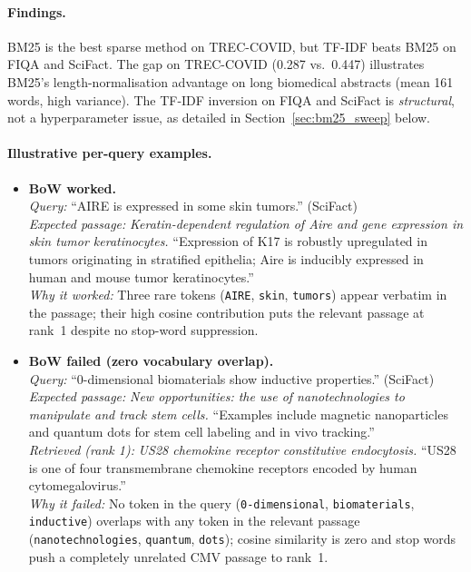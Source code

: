 \documentclass[12pt, a4paper]{article}
\newcommand{\tc}{TREC-COVID}
\newcommand{\fiqa}{FIQA}
\newcommand{\scifact}{SciFact}
\begin{document}
\paragraph{Findings.}
BM25 is the best sparse method on \tc{}, but TF-IDF beats BM25 on \fiqa{}
and \scifact{}.  The gap on \tc{} (0.287 vs.\ 0.447) illustrates BM25's
length-normalisation advantage on long biomedical abstracts (mean 161 words,
high variance).  The TF-IDF inversion on \fiqa{} and \scifact{} is
\emph{structural}, not a hyperparameter issue, as detailed in
Section~\ref{sec:bm25_sweep} below.

\paragraph{Illustrative per-query examples.}
\begin{itemize}

\item \textbf{BoW worked.}\\
  \textit{Query:} ``AIRE is expressed in some skin tumors.'' (\scifact{})\\
  \textit{Expected passage:} \textit{Keratin-dependent regulation of Aire and gene expression
    in skin tumor keratinocytes.} ``Expression of K17 is robustly upregulated in tumors
    originating in stratified epithelia; Aire is inducibly expressed in human and mouse
    tumor keratinocytes.''\\
  \textit{Why it worked:} Three rare tokens (\texttt{AIRE}, \texttt{skin}, \texttt{tumors})
    appear verbatim in the passage; their high cosine contribution puts the relevant passage
    at rank~1 despite no stop-word suppression.

\item \textbf{BoW failed (zero vocabulary overlap).}\\
  \textit{Query:} ``0-dimensional biomaterials show inductive properties.'' (\scifact{})\\
  \textit{Expected passage:} \textit{New opportunities: the use of nanotechnologies to
    manipulate and track stem cells.} ``Examples include magnetic nanoparticles and quantum
    dots for stem cell labeling and in vivo tracking.''\\
  \textit{Retrieved (rank 1):} \textit{US28 chemokine receptor constitutive endocytosis.}
    ``US28 is one of four transmembrane chemokine receptors encoded by human
    cytomegalovirus.''\\
  \textit{Why it failed:} No token in the query (\texttt{0-dimensional}, \texttt{biomaterials},
    \texttt{inductive}) overlaps with any token in the relevant passage (\texttt{nanotechnologies},
    \texttt{quantum}, \texttt{dots}); cosine similarity is zero and stop words push a
    completely unrelated CMV passage to rank~1.


\end{itemize}
\end{document}
